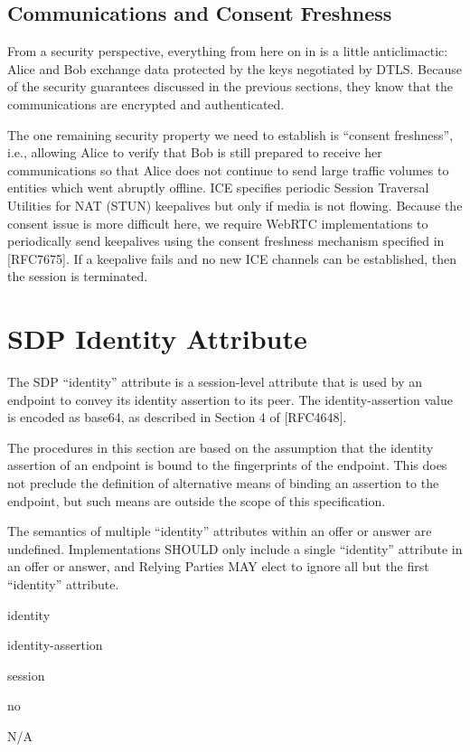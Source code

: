 \documentclass{article}
\begin{document}
\subsection{Communications and Consent Freshness}

From a security perspective, everything from here on in is a little
anticlimactic: Alice and Bob exchange data protected by the keys
negotiated by DTLS.  Because of the security guarantees discussed in
the previous sections, they know that the communications are
encrypted and authenticated.

The one remaining security property we need to establish is ``consent
freshness'', i.e., allowing Alice to verify that Bob is still prepared
to receive her communications so that Alice does not continue to send
large traffic volumes to entities which went abruptly offline.  ICE
specifies periodic Session Traversal Utilities for NAT (STUN)
keepalives but only if media is not flowing.  Because the consent
issue is more difficult here, we require WebRTC implementations to
periodically send keepalives using the consent freshness mechanism
specified in [RFC7675].  If a keepalive fails and no new ICE channels
can be established, then the session is terminated.

\section{SDP Identity Attribute}

The SDP ``identity'' attribute is a session-level attribute that is
used by an endpoint to convey its identity assertion to its peer.
The identity-assertion value is encoded as base64, as described in
Section 4 of [RFC4648].

The procedures in this section are based on the assumption that the
identity assertion of an endpoint is bound to the fingerprints of the
endpoint.  This does not preclude the definition of alternative means
of binding an assertion to the endpoint, but such means are outside
the scope of this specification.

The semantics of multiple ``identity'' attributes within an offer or
answer are undefined.  Implementations SHOULD only include a single
``identity'' attribute in an offer or answer, and Relying Parties MAY
elect to ignore all but the first ``identity'' attribute.

\begin{description}[style=nextline]
\item[Name:] identity
\item[Value:] identity-assertion
\item[Usage Level:] session
\item[Charset Dependent:] no
\item[Default Value:] N/A
\end{description}
\end{document}

